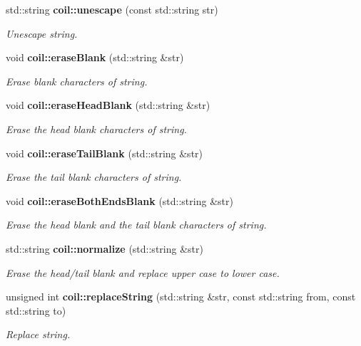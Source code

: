 \begin{DoxyCompactItemize}
std::string {\bf coil::unescape} (const std::string str)
\begin{DoxyCompactList}\small\item\em Unescape string. \item\end{DoxyCompactList}\item 
void {\bf coil::eraseBlank} (std::string \&str)
\begin{DoxyCompactList}\small\item\em Erase blank characters of string. \item\end{DoxyCompactList}\item 
void {\bf coil::eraseHeadBlank} (std::string \&str)
\begin{DoxyCompactList}\small\item\em Erase the head blank characters of string. \item\end{DoxyCompactList}\item 
void {\bf coil::eraseTailBlank} (std::string \&str)
\begin{DoxyCompactList}\small\item\em Erase the tail blank characters of string. \item\end{DoxyCompactList}\item 
void {\bf coil::eraseBothEndsBlank} (std::string \&str)
\begin{DoxyCompactList}\small\item\em Erase the head blank and the tail blank characters of string. \item\end{DoxyCompactList}\item 
std::string {\bf coil::normalize} (std::string \&str)
\begin{DoxyCompactList}\small\item\em Erase the head/tail blank and replace upper case to lower case. \item\end{DoxyCompactList}\item 
unsigned int {\bf coil::replaceString} (std::string \&str, const std::string from, const std::string to)
\begin{DoxyCompactList}\small\item\em Replace string. \item\end{DoxyCompactList}\item 

\end{DoxyCompactItemize}

